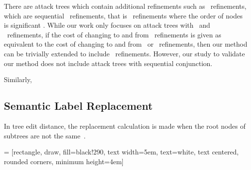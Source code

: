 There are attack trees which contain additional refinements such as \SAND\ refinements, which are sequential \AND\ refinements, that is \AND\ refinements where the order of nodes is significant \cite{jhawar_attack_2015}. While our work only focuses on attack trees with \AND\ and \OR\ refinements, if the cost of changing to and from \SAND\ refinements is given as equivalent to the cost of changing to and from \AND\ or \OR\ refinements, then our method can be trivially extended to include \SAND\ refinements. However, our study to validate our method does not include attack trees with sequential conjunction.

Similarly, 


\subsection{Semantic Label Replacement}

In tree edit distance, the replacement calculation is made when the root nodes of subtrees are not the same~\cite{zhang_simple_1989}.


 = [rectangle, draw, fill=black!290,
text width=5em, text=white,  text centered, rounded corners, minimum height=4em]


